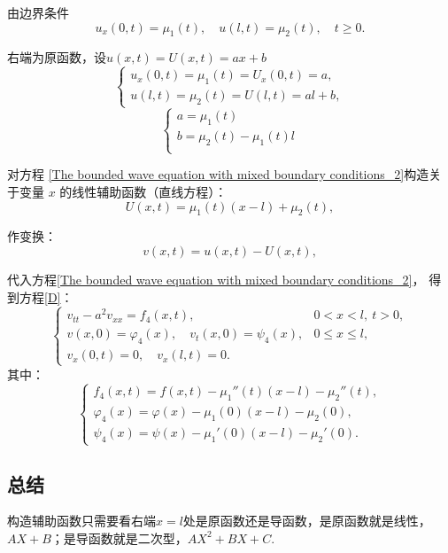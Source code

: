 \documentclass[12pt,a4paper]{article}
\numberwithin{subsection}{section}   %
\numberwithin{subsubsection}{subsection}
\theoremstyle{plain}
\theoremstyle{definition}
\theoremstyle{remark}
\theoremstyle{remark}
\begin{document}
	由边界条件
	\begin{equation}
		u_x(0,t) = \mu_1(t), \quad u(l,t) = \mu_2(t), \quad t \geq 0.
	\end{equation}
	
	右端为原函数，设$u(x, t)=U(x, t)=ax+b$
	\[
	\begin{cases}
		u_x(0, t) = \mu_1(t) = U_x(0, t) = a, \\
		u(l, t) = \mu_2(t) = U(l, t) = al + b,
	\end{cases}
	\]
	\[
	\begin{cases}
		a =\mu_1(t)\\
		b =\mu_2(t)-\mu_1(t)l \\
	\end{cases}
	\]
	
	对方程 \eqref{The bounded wave equation with mixed boundary conditions_2}构造关于变量 \(x\) 的线性辅助函数（直线方程）：
	\begin{equation}
		U(x, t) = \mu_1(t)(x-l) + \mu_2(t) ,
	\end{equation}
	
	作变换：
	\begin{equation}
		v(x, t) = u(x, t) - U(x, t),
	\end{equation}
	
	代入方程\eqref{The bounded wave equation with mixed boundary conditions_2}，
	得到方程\eqref{D}：
	\begin{equation}\label{D}
		\begin{cases}
			v_{tt} - a^2 v_{xx} = f_4(x, t), & 0 < x < l, \ t > 0, \\
			v(x, 0) = \varphi_4(x), \quad v_t(x, 0) = \psi_4(x), & 0 \leq x \leq l, \\
			v_x(0, t) = 0, \quad v_x(l, t) = 0. &
		\end{cases}
	\end{equation}
	其中：
	\begin{equation}
		\begin{cases}
			f_4(x, t) = f(x, t) - \mu_1''(t) (x-l)- \mu_2''(t) , \\
			\varphi_4(x) = \varphi(x) - \mu_1(0)(x-l)- \mu_2(0), \\
			\psi_4(x) = \psi(x) - \mu_1'(0)(x-l) - \mu_2'(0).
		\end{cases}
	\end{equation}
	
	
	\subsection{总结}
	构造辅助函数只需要看右端$x=l$处是原函数还是导函数，是原函数就是线性，$AX+B$；是导函数就是二次型，$AX^2+BX+C$.
	
\end{document}
